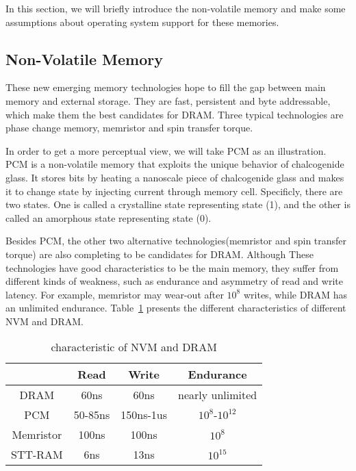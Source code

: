 \documentclass[10pt, conference, compsocconf]{IEEEtran}
\begin{document}
In this section, we will briefly introduce the non-volatile memory and
make some assumptions about operating system support for these memories.

\subsection{Non-Volatile Memory}

These new emerging memory technologies hope to fill the gap between main memory and external storage.
They are fast, persistent and byte addressable, which make them the best candidates for DRAM.
Three typical technologies are phase change memory, memristor and spin transfer torque.

In order to get a more perceptual view, we will take PCM as an illustration. 
PCM is a non-volatile memory that exploits the unique behavior of chalcogenide glass.
It stores bits by heating a nanoscale piece of chalcogenide glass and makes it to change state by injecting current through memory cell.
Specificly, there are two states.
One is called a crystalline state representing state (1), and the other is called an amorphous state representing state (0).

Besides PCM, the other two alternative technologies(memristor and spin transfer torque) are also completing to be candidates for DRAM.
Although These technologies have good characteristics to be the main memory,
they suffer from different kinds of weakness, such as endurance and asymmetry of read and write latency. 
For example, memristor may wear-out after $10^8$ writes, while DRAM has an unlimited endurance.
Table~\ref{tab:NVMvsDRAM} presents the different characteristics of different NVM and DRAM.

\begin{table}[h]
    \centering
    \begin{tabular}{|c|c|c|c|} \hline
        & Read & Write & Endurance\\ \hline
        DRAM & 60ns & 60ns & nearly unlimited\\ \hline
        PCM & 50-85ns & 150ns-1us & $10^8$-$10^{12}$\\ \hline
        Memristor & 100ns & 100ns & $10^8$\\ \hline
        STT-RAM & 6ns & 13ns & $10^{15}$\\ \hline
    \end{tabular}
    \caption{characteristic of NVM and DRAM}
\label{tab:NVMvsDRAM}
\end{table}
\end{document}
